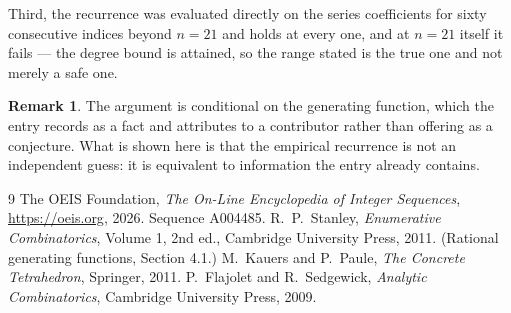 \documentclass[11pt,a4paper]{article}
\theoremstyle{plain}
\theoremstyle{definition}
\newtheorem{remark}[theorem]{Remark}
\begin{document}
Third, the recurrence was evaluated directly on the series coefficients for sixty consecutive
indices beyond $n=21$ and holds at every one, and at $n=21$ itself it fails --- the
degree bound is attained, so the range stated is the true one and not merely a safe one.

\begin{remark}
The argument is conditional on the generating function, which the entry records as a fact and
attributes to a contributor rather than offering as a conjecture. What is shown here is that
the empirical recurrence is not an independent guess: it is equivalent to information the
entry already contains.
\end{remark}

\begin{thebibliography}{9}
 The OEIS Foundation, \emph{The On-Line Encyclopedia of Integer
Sequences}, \url{https://oeis.org}, 2026. Sequence A004485.
 R.~P.~Stanley, \emph{Enumerative Combinatorics}, Volume 1, 2nd ed.,
Cambridge University Press, 2011. (Rational generating functions, Section 4.1.)
 M.~Kauers and P.~Paule, \emph{The Concrete Tetrahedron}, Springer, 2011.
 P.~Flajolet and R.~Sedgewick, \emph{Analytic Combinatorics}, Cambridge
University Press, 2009.
\end{thebibliography}
\end{document}
